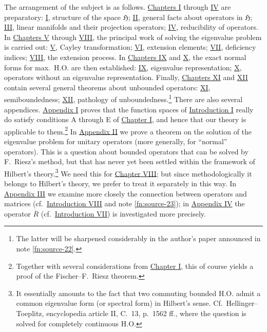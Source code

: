 ﻿\documentclass[paper=b5,fontsize=13pt,bookmarkpackage=false,twoside]{scrartcl}
\begin{document}
The arrangement of the subject is as follows. \hyperref[chap:I]{Chapters I} through \hyperref[chap:IV]{IV} are preparatory: \hyperref[chap:I]{I}, structure of the space $\mathfrak H$; \hyperref[chap:II]{II}, general facts about operators in $\mathfrak H$; \hyperref[chap:III]{III}, linear manifolds and their projection operators; \hyperref[chap:IV]{IV}, reducibility of operators. In \hyperref[chap:V]{Chapters V} through \hyperref[chap:VIII]{VIII}, the principal work of solving the eigenvalue problem is carried out: \hyperref[chap:V]{V}, Cayley transformation; \hyperref[chap:VI]{VI}, extension elements; \hyperref[chap:VII]{VII}, deficiency indices; \hyperref[chap:VIII]{VIII}, the extension process. In \hyperref[chap:IX]{Chapters IX} and \hyperref[chap:X]{X}, the exact normal forms for max.\ H.O. are then established: \hyperref[chap:IX]{IX}, eigenvalue representation; \hyperref[chap:X]{X}, operators without an eigenvalue representation. Finally, \hyperref[chap:XI]{Chapters XI} and \hyperref[chap:XII]{XII} contain several general theorems about unbounded operators: \hyperref[chap:XI]{XI}, semiboundedness; \hyperref[chap:XII]{XII}, pathology of unboundedness.\footnote{\label{fn:source-24}The latter will be sharpened considerably in the author's paper announced in note \ref{fn:source-22}.} There are also several appendices. \hyperref[app:I]{Appendix I} proves that the function spaces of \hyperref[intro:I]{Introduction I} really do satisfy conditions A through E of \hyperref[chap:I]{Chapter I}, and hence that our theory is applicable to them.\footnote{\label{fn:source-25}Together with several considerations from \hyperref[chap:I]{Chapter I}, this of course yields a proof of the Fischer--F.~Riesz theorem.} In \hyperref[app:II]{Appendix II} we prove a theorem on the solution of the eigenvalue problem for unitary operators (more generally, for ``normal'' operators). This is a question about bounded operators that can be solved by F.~Riesz's method, but that has never yet been settled within the framework of Hilbert's theory.\footnote{\label{fn:source-26}It essentially amounts to the fact that two commuting bounded H.O. admit a common eigenvalue form (or spectral form) in Hilbert's sense. Cf.\ Hellinger--Toeplitz, encyclopedia article II, C.~13, p.~1562 ff., where the question is solved for completely continuous H.O.} We need this for \hyperref[chap:VIII]{Chapter VIII}; but since methodologically it belongs to Hilbert's theory, we prefer to treat it separately in this way. In \hyperref[app:III]{Appendix III} we examine more closely the connection between operators and matrices (cf.\ \hyperref[intro:VIII]{Introduction VIII} and note \ref{fn:source-23}); in \hyperref[app:IV]{Appendix IV} the operator $\overline R$ (cf.\ \hyperref[intro:VII]{Introduction VII}) is investigated more precisely.
\end{document}
